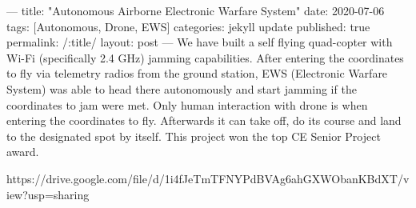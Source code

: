 ---
title: "Autonomous Airborne Electronic Warfare System"
date: 2020-07-06
tags: [Autonomous, Drone, EWS]
categories: jekyll update
published: true
permalink: /:title/
layout: post
---
We have built a self flying quad-copter with Wi-Fi (specifically 2.4 GHz) jamming capabilities. After entering the coordinates to fly via telemetry radios from the ground station, EWS (Electronic Warfare System) was able to head there autonomously and start jamming if the coordinates to jam were met. Only human interaction with drone is when entering the coordinates to fly. Afterwards it can take off, do its course and land to the designated spot by itself. This project won the top CE Senior Project award.


https://drive.google.com/file/d/1i4fJeTmTFNYPdBVAg6ahGXWObanKBdXT/view?usp=sharing